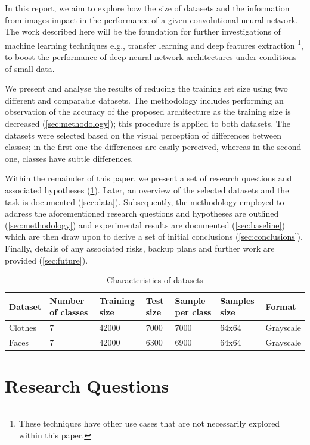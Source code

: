 \documentclass{article}
\begin{document}
In this report, we aim to explore how the size of datasets and the information from images impact in the performance of a given convolutional neural network. The work described here will be the foundation for further investigations of machine learning techniques e.g., transfer learning and deep features extraction \footnote{These techniques have other use cases that are not necessarily explored within this paper.}, to boost the performance of deep neural network architectures under conditions of small data.

We present and analyse the results of reducing the training set size using two different and comparable datasets. The methodology includes performing an observation of the accuracy of the proposed architecture as the training size is decreased (\ref{sec:methodology}); this procedure is applied to both datasets. The datasets were selected based on the visual perception of differences between classes; in the first one the differences are easily perceived, whereas in the second one, classes have subtle differences.

Within the remainder of this paper, we present a set of research questions and associated hypotheses (\ref{sec:questions}). Later, an overview of the selected datasets and the task is documented (\ref{sec:data}). Subsequently, the methodology employed to address the aforementioned research questions and hypotheses are outlined (\ref{sec:methodology}) and experimental results are documented (\ref{sec:baseline}) which are then draw upon to derive a set of initial conclusions (\ref{sec:conclusions}). Finally, details of any associated risks, backup plans and further work are provided (\ref{sec:future}).

 
\begin{table}[!htb]
  \centering
  \begin{tabular}{| l | l | l | l | l | l | l |}
    \hline
    \textbf{Dataset} & \textbf{Number of classes} & \textbf{Training size} & \textbf{Test size}  &  \textbf{Sample per class} & \textbf{Samples size} & \textbf{Format} \\ \hline
    Clothes & 7 & 42000 & 7000 & 7000 & 64x64 & Grayscale\\ \hline
    Faces & 7 & 42000 & 6300 & 6900 & 64x64 & Grayscale\\ \hline
  \end{tabular}
  \caption{Characteristics of datasets}
  \label{tab:1}
\end{table}

\section{Research Questions}
\label{sec:questions}
\end{document}

